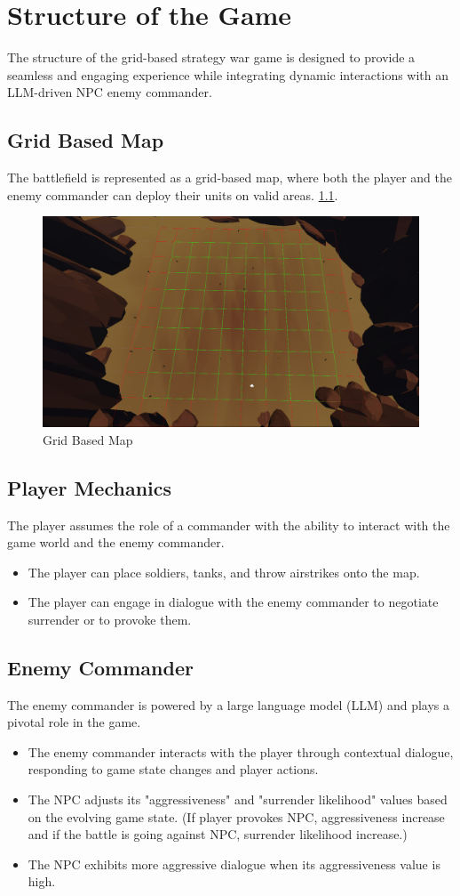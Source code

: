 \chapter{Structure of the Game}
The structure of the grid-based strategy war game is designed to provide a seamless and engaging experience while integrating dynamic interactions with an LLM-driven NPC enemy commander. 
\section{Grid Based Map}
The battlefield is represented as a grid-based map, where both the player and the enemy commander can deploy their units on valid areas. \ref{fig:Grid-Based-Map}.
\begin{figure}[!htbp]
    \centering
    \includegraphics[width=0.5\linewidth]{map_grids.png}
    \caption{Grid Based Map}
    \label{fig:Grid-Based-Map}
\end{figure}

\section{Player Mechanics}
The player assumes the role of a commander with the ability to interact with the game world and the enemy commander.

\begin{itemize}
    \item The player can place soldiers, tanks, and throw airstrikes onto the map.
    \item The player can engage in dialogue with the enemy commander to negotiate surrender or to provoke them.
\end{itemize}

\section{Enemy Commander}
The enemy commander is powered by a large language model (LLM) and plays a pivotal role in the game.
\begin{itemize}
    \item The enemy commander interacts with the player through contextual dialogue, responding to game state changes and player actions.
    \item The NPC adjusts its "aggressiveness" and "surrender likelihood" values based on the evolving game state. (If player provokes NPC, aggressiveness increase and if the battle is going against NPC, surrender likelihood increase.)
    \item The NPC exhibits more aggressive dialogue when its aggressiveness value is high.
\end{itemize}

